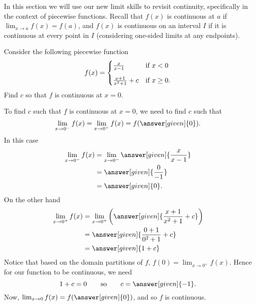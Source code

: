 \documentclass{ximera}
\begin{document}


In this section we will use our new limit skills to revisit continuity, specifically in the context of piecewise functions. Recall that $f(x)$ is continuous at $a$ if $\displaystyle\lim_{x\rightarrow a}f(x)=f(a)$, and $f(x)$ is continuous on an interval $I$ if it is continuous at every point in $I$ (considering one-sided limits at any endpoints).

\begin{example}
Consider the following piecewise function
\[
f(x) = 
\begin{cases}
  \frac{x}{x-1} &\text{if $x<0$}\vspace{.1in}\\
  \frac{x+1}{x^2+1} + c &\text{if $x\ge 0$}.
\end{cases}
\]
Find $c$ so that $f$ is continuous at $x=0$.
\begin{explanation}
  To find $c$ such that $f$ is continuous at $x=0$, we need to find
  $c$ such that
  \[
  \lim_{x\to 0^-} f(x) = \lim_{x\to 0^+}f(x) = f(\answer[given]{0}).
  \]
  In this case
  \begin{align*}
    \lim_{x\to 0^-} f(x) &= \lim_{x\to 0^-}\answer[given]{\frac{x}{x-1}}\\
    &= \answer[given]{\frac{0}{-1}}\\
    &=\answer[given]{0}.
  \end{align*}
  On the other hand
  \begin{align*}
    \lim_{x\to 0^+} f(x) &= \lim_{x\to 0^+}\left(\answer[given]{\frac{x+1}{x^2+1} + c}\right)\\
    &= \answer[given]{\frac{0+1}{0^2+1} + c}\\
    &= \answer[given]{1+ c}
  \end{align*}
 Notice that based on the domain partitions of $f$, $f(0)=\lim_{x\to 0^+} f(x)$. Hence for our function to be continuous, we need
  \[
  1 + c = 0\qquad\text{so}\qquad c = \answer[given]{-1}.
  \]
  Now, $\lim_{x\to 0} f(x) = f(\answer[given]{0})$, and so $f$ is continuous.
\end{explanation}
\end{example}
\end{document}
